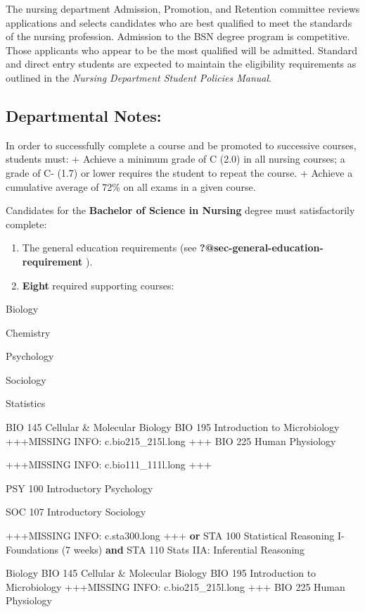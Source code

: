 \documentclass[
  letterpaper,
]{scrbook}
\begin{document}
The nursing department Admission, Promotion, and Retention committee
reviews applications and selects candidates who are best qualified to
meet the standards of the nursing profession. Admission to the BSN
degree program is competitive. Those applicants who appear to be the
most qualified will be admitted. Standard and direct entry students are
expected to maintain the eligibility requirements as outlined in the
\emph{Nursing Department Student Policies Manual}.

\hypertarget{departmental-notes-1}{%
\subsection{Departmental Notes:}\label{departmental-notes-1}}

In order to successfully complete a course and be promoted to successive
courses, students must: + Achieve a minimum grade of C (2.0) in all
nursing courses; a grade of C- (1.7) or lower requires the student to
repeat the course. + Achieve a cumulative average of 72\% on all exams
in a given course.

Candidates for the \textbf{Bachelor of Science in Nursing} degree must
satisfactorily complete:

\begin{enumerate}
\def\labelenumi{\arabic{enumi}.}
\item
  The general education requirements (see
  \textbf{?@sec-general-education-requirement} ).
\item
  \textbf{Eight} required supporting courses:
\end{enumerate}

Biology

Chemistry

Psychology

Sociology

Statistics

BIO 145 Cellular \& Molecular Biology BIO 195 Introduction to
Microbiology +++MISSING INFO: c.bio215\_215l.long +++ BIO 225 Human
Physiology

+++MISSING INFO: c.bio111\_111l.long +++

PSY 100 Introductory Psychology

SOC 107 Introductory Sociology

+++MISSING INFO: c.sta300.long +++ \textbf{or} STA 100 Statistical
Reasoning I-Foundations (7 weeks) \textbf{and} STA 110 Stats IIA:
Inferential Reasoning

Biology BIO 145 Cellular \& Molecular Biology BIO 195 Introduction to
Microbiology +++MISSING INFO: c.bio215\_215l.long +++ BIO 225 Human
Physiology
\end{document}
